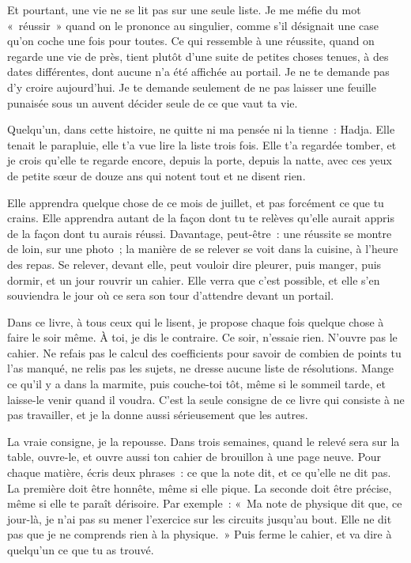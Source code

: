 \documentclass[10.5pt,twoside,openright]{book}
\begin{document}
Et pourtant, une vie ne se lit pas sur une seule liste. Je me méfie du mot « réussir » quand on le prononce au singulier, comme s’il désignait une case qu’on coche une fois pour toutes. Ce qui ressemble à une réussite, quand on regarde une vie de près, tient plutôt d’une suite de petites choses tenues, à des dates différentes, dont aucune n’a été affichée au portail. Je ne te demande pas d’y croire aujourd’hui. Je te demande seulement de ne pas laisser une feuille punaisée sous un auvent décider seule de ce que vaut ta vie.

Quelqu’un, dans cette histoire, ne quitte ni ma pensée ni la tienne : Hadja. Elle tenait le parapluie, elle t’a vue lire la liste trois fois. Elle t’a regardée tomber, et je crois qu’elle te regarde encore, depuis la porte, depuis la natte, avec ces yeux de petite sœur de douze ans qui notent tout et ne disent rien.

Elle apprendra quelque chose de ce mois de juillet, et pas forcément ce que tu crains. Elle apprendra autant de la façon dont tu te relèves qu’elle aurait appris de la façon dont tu aurais réussi. Davantage, peut-être : une réussite se montre de loin, sur une photo ; la manière de se relever se voit dans la cuisine, à l’heure des repas. Se relever, devant elle, peut vouloir dire pleurer, puis manger, puis dormir, et un jour rouvrir un cahier. Elle verra que c’est possible, et elle s’en souviendra le jour où ce sera son tour d’attendre devant un portail.

Dans ce livre, à tous ceux qui le lisent, je propose chaque fois quelque chose à faire le soir même. À toi, je dis le contraire. Ce soir, n’essaie rien. N’ouvre pas le cahier. Ne refais pas le calcul des coefficients pour savoir de combien de points tu l’as manqué, ne relis pas les sujets, ne dresse aucune liste de résolutions. Mange ce qu’il y a dans la marmite, puis couche-toi tôt, même si le sommeil tarde, et laisse-le venir quand il voudra. C’est la seule consigne de ce livre qui consiste à ne pas travailler, et je la donne aussi sérieusement que les autres.

La vraie consigne, je la repousse. Dans trois semaines, quand le relevé sera sur la table, ouvre-le, et ouvre aussi ton cahier de brouillon à une page neuve. Pour chaque matière, écris deux phrases : ce que la note dit, et ce qu’elle ne dit pas. La première doit être honnête, même si elle pique. La seconde doit être précise, même si elle te paraît dérisoire. Par exemple : « Ma note de physique dit que, ce jour-là, je n’ai pas su mener l’exercice sur les circuits jusqu’au bout. Elle ne dit pas que je ne comprends rien à la physique. » Puis ferme le cahier, et va dire à quelqu’un ce que tu as trouvé.
\end{document}

